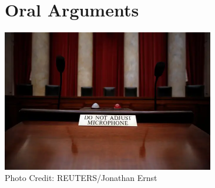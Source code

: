 \newpage
\section{Oral Arguments}

\vspace{5mm}
\begin{center}
    \includegraphics[width=350px]{images/oa_intro.png}\\[2mm]
    \footnotesize{Photo Credit: REUTERS/Jonathan Ernst}
\end{center}

\vspace{5mm}

